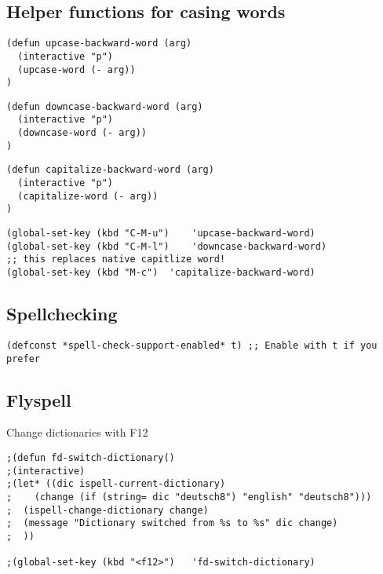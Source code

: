 \documentclass[11pt]{article}
\begin{document}
\subsection*{Helper functions for casing words}
\label{sec:org423774f}

\begin{verbatim}
(defun upcase-backward-word (arg)
  (interactive "p")
  (upcase-word (- arg))
)
\end{verbatim}

\begin{verbatim}
(defun downcase-backward-word (arg)
  (interactive "p")
  (downcase-word (- arg))
)
\end{verbatim}

\begin{verbatim}
(defun capitalize-backward-word (arg)
  (interactive "p")
  (capitalize-word (- arg))
)
\end{verbatim}

\begin{verbatim}
(global-set-key (kbd "C-M-u")	 'upcase-backward-word)
(global-set-key (kbd "C-M-l")	 'downcase-backward-word)
;; this replaces native capitlize word!
(global-set-key (kbd "M-c")	 'capitalize-backward-word)
\end{verbatim}

\subsection*{Spellchecking}
\label{sec:orgf3109d5}

\begin{verbatim}
(defconst *spell-check-support-enabled* t) ;; Enable with t if you prefer
\end{verbatim}

\subsection*{Flyspell}
\label{sec:org328c4de}

Change dictionaries with F12

\begin{verbatim}
;(defun fd-switch-dictionary()
;(interactive)
;(let* ((dic ispell-current-dictionary)
;    (change (if (string= dic "deutsch8") "english" "deutsch8")))
;  (ispell-change-dictionary change)
;  (message "Dictionary switched from %s to %s" dic change)
;  ))

;(global-set-key (kbd "<f12>")   'fd-switch-dictionary)
\end{verbatim}
\end{document}
